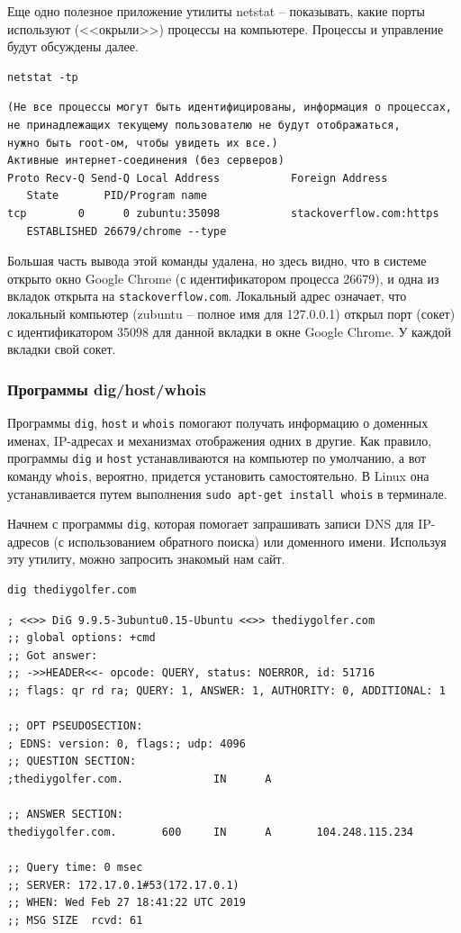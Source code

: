 \documentclass[12pt]{article}
\begin{document}
Еще одно полезное приложение утилиты netstat -- показывать, какие порты
используют (<<окрыли>>) процессы на компьютере. Процессы и управление будут обсуждены далее.
\begin{verbatim}
netstat -tp
\end{verbatim}

\begin{verbatim}
(Не все процессы могут быть идентифицированы, информация о процессах,
не принадлежащих текущему пользователю не будут отображаться,
нужно быть root-ом, чтобы увидеть их все.)
Активные интернет-соединения (без серверов)
Proto Recv-Q Send-Q Local Address           Foreign Address
   State       PID/Program name
tcp        0      0 zubuntu:35098           stackoverflow.com:https
   ESTABLISHED 26679/chrome --type
\end{verbatim}
Большая часть вывода этой команды удалена, но здесь видно, что в системе
открыто окно Google Chrome (с идентификатором процесса 26679), и одна из
вкладок открыта на \texttt{stackoverflow.com}. Локальный адрес означает, что
локальный компьютер (zubuntu -- полное имя для 127.0.0.1) открыл порт
(сокет) с идентификатором 35098 для данной вкладки в окне Google Chrome.
У каждой вкладки свой сокет.

\hypertarget{dig-host-whois}{%
\subsubsection{\texorpdfstring{\protect\hyperlink{dig-host-whois}{}Программы
dig/host/whois}{Программы dig/host/whois}}\label{dig-host-whois}}

Программы \texttt{dig}, \texttt{host} и \texttt{whois} помогают получать
информацию о доменных именах, IP-адресах и механизмах отображения одних
в другие. Как правило, программы \texttt{dig} и \texttt{host}
устанавливаются на компьютер по умолчанию, а вот команду \texttt{whois},
вероятно, придется установить самостоятельно. В Linux она
устанавливается путем выполнения \texttt{sudo\ apt-get\ install\ whois}
в терминале.

Начнем с программы \texttt{dig}, которая помогает запрашивать записи DNS
для IP-адресов (с использованием обратного поиска) или доменного имени.
Используя эту утилиту, можно запросить знакомый нам сайт.

\begin{verbatim}
dig thediygolfer.com
\end{verbatim}

\begin{verbatim}
; <<>> DiG 9.9.5-3ubuntu0.15-Ubuntu <<>> thediygolfer.com
;; global options: +cmd
;; Got answer:
;; ->>HEADER<<- opcode: QUERY, status: NOERROR, id: 51716
;; flags: qr rd ra; QUERY: 1, ANSWER: 1, AUTHORITY: 0, ADDITIONAL: 1

;; OPT PSEUDOSECTION:
; EDNS: version: 0, flags:; udp: 4096
;; QUESTION SECTION:
;thediygolfer.com.              IN      A

;; ANSWER SECTION:
thediygolfer.com.       600     IN      A       104.248.115.234

;; Query time: 0 msec
;; SERVER: 172.17.0.1#53(172.17.0.1)
;; WHEN: Wed Feb 27 18:41:22 UTC 2019
;; MSG SIZE  rcvd: 61
\end{verbatim}
\end{document}
